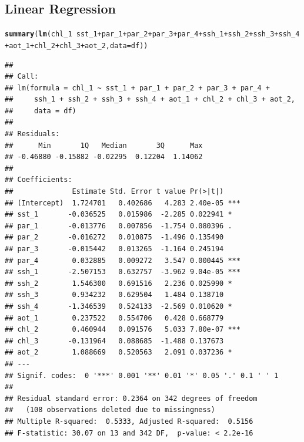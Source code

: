 \documentclass{article}\usepackage[]{graphicx}\usepackage[]{color}
\makeatletter
\newcommand{\hlopt}[1]{\textcolor[rgb]{0,0,0}{#1}}%
\newcommand{\hlstd}[1]{\textcolor[rgb]{0.345,0.345,0.345}{#1}}%
\newcommand{\hlkwc}[1]{\textcolor[rgb]{0.333,0.667,0.333}{#1}}%
\newcommand{\hlkwd}[1]{\textcolor[rgb]{0.737,0.353,0.396}{\textbf{#1}}}%
\newenvironment{kframe}{%
 \def\at@end@of@kframe{}%
 \ifinner\ifhmode%
  \def\at@end@of@kframe{\end{minipage}}%
  \begin{minipage}{\columnwidth}%
 \fi\fi%
 \def\FrameCommand##1{\hskip\@totalleftmargin \hskip-\fboxsep
 \colorbox{shadecolor}{##1}\hskip-\fboxsep
     \hskip-\linewidth \hskip-\@totalleftmargin \hskip\columnwidth}%
 \MakeFramed {\advance\hsize-\width
   \@totalleftmargin\z@ \linewidth\hsize
   \@setminipage}}%
 {\par\unskip\endMakeFramed%
 \at@end@of@kframe}
\newenvironment{knitrout}{}{} %
\makeatother
\begin{document}
\subsection{Linear Regression}

\begin{knitrout}
\color{fgcolor}\begin{kframe}
\begin{alltt}
\hlkwd{summary}\hlstd{(}\hlkwd{lm}\hlstd{(chl_1}\hlopt{~}\hlstd{sst_1}\hlopt{+}\hlstd{par_1}\hlopt{+}\hlstd{par_2}\hlopt{+}\hlstd{par_3}\hlopt{+}\hlstd{par_4}\hlopt{+}\hlstd{ssh_1}\hlopt{+}\hlstd{ssh_2}\hlopt{+}\hlstd{ssh_3}\hlopt{+}\hlstd{ssh_4}\hlopt{+}\hlstd{aot_1}\hlopt{+}\hlstd{chl_2}\hlopt{+}\hlstd{chl_3}\hlopt{+}\hlstd{aot_2,} \hlkwc{data}\hlstd{=df))}
\end{alltt}
\begin{verbatim}
## 
## Call:
## lm(formula = chl_1 ~ sst_1 + par_1 + par_2 + par_3 + par_4 + 
##     ssh_1 + ssh_2 + ssh_3 + ssh_4 + aot_1 + chl_2 + chl_3 + aot_2, 
##     data = df)
## 
## Residuals:
##      Min       1Q   Median       3Q      Max 
## -0.46880 -0.15882 -0.02295  0.12204  1.14062 
## 
## Coefficients:
##              Estimate Std. Error t value Pr(>|t|)    
## (Intercept)  1.724701   0.402686   4.283 2.40e-05 ***
## sst_1       -0.036525   0.015986  -2.285 0.022941 *  
## par_1       -0.013776   0.007856  -1.754 0.080396 .  
## par_2       -0.016272   0.010875  -1.496 0.135490    
## par_3       -0.015442   0.013265  -1.164 0.245194    
## par_4        0.032885   0.009272   3.547 0.000445 ***
## ssh_1       -2.507153   0.632757  -3.962 9.04e-05 ***
## ssh_2        1.546300   0.691516   2.236 0.025990 *  
## ssh_3        0.934232   0.629504   1.484 0.138710    
## ssh_4       -1.346539   0.524133  -2.569 0.010620 *  
## aot_1        0.237522   0.554706   0.428 0.668779    
## chl_2        0.460944   0.091576   5.033 7.80e-07 ***
## chl_3       -0.131964   0.088685  -1.488 0.137673    
## aot_2        1.088669   0.520563   2.091 0.037236 *  
## ---
## Signif. codes:  0 '***' 0.001 '**' 0.01 '*' 0.05 '.' 0.1 ' ' 1
## 
## Residual standard error: 0.2364 on 342 degrees of freedom
##   (108 observations deleted due to missingness)
## Multiple R-squared:  0.5333,	Adjusted R-squared:  0.5156 
## F-statistic: 30.07 on 13 and 342 DF,  p-value: < 2.2e-16
\end{verbatim}
\end{kframe}
\end{knitrout}
\end{document}
